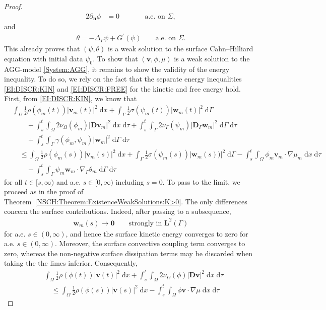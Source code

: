 \documentclass[11pt,reqno]{amsart}
\theoremstyle{remark}
\numberwithin{equation}{section}
\newcommand{\abs}[1]{|#1|}
\newcommand{\n}{\mathbf{n}}
\newcommand{\intO}{\int_\Omega}
\newcommand{\intG}{\int_\Gamma}
\newcommand{\dx}{\;\mathrm{d}x}
\newcommand{\dxtau}{\;\mathrm{d}x\;\mathrm{d}\tau}
\newcommand{\dGtau}{\;\mathrm{d}\Ga\;\mathrm{d}\tau}
\newcommand{\dG}{\;\mathrm d\Ga}
\newcommand{\deln}{\partial_\n}
\newcommand{\Grad}{\nabla}
\newcommand{\Gradg}{\nabla_\Ga}
\newcommand{\Lapg}{\Delta_\Ga}
\newcommand{\Om}{\Omega}
\newcommand{\Ga}{\Gamma}
\newcommand{\bv}{\mathbf v}
\newcommand{\bw}{\mathbf w}
\newcommand{\D}{\mathbf D}
\newcommand{\Dg}{\mathbf D_\Ga}
\begin{document}
\begin{proof}
\begin{alignat*}{2}
    \deln\phi &= 0 &&\qquad\text{a.e.~on~}\Sigma,
\end{alignat*}
and
\begin{align*}
    \theta = -\Lapg\psi + G^\prime(\psi) \qquad\text{a.e.~on~}\Sigma.
\end{align*} 
This already proves that $(\psi,\theta)$ is a weak solution to the surface Cahn--Hilliard equation with initial data $\psi_0$.
To show that $(\bv,\phi,\mu)$ is a weak solution to the AGG-model \eqref{System:AGG}, it remains to show the validity of the energy inequality. To do so, we rely on the fact that the separate energy inequalities \eqref{EI:DISCR:KIN} and \eqref{EI:DISCR:FREE} for the kinetic and free energy hold. First, from \eqref{EI:DISCR:KIN}, we know that
\begin{align*}%
    &\intO\frac12\rho(\phi_m(t))\abs{\bv_m(t)}^2\dx + \intG\frac12\sigma(\psi_m(t))\abs{\bw_m(t)}^2\dG \nonumber \\
    &\qquad + \int_s^t\intO 2\nu_\Om(\phi_m)\abs{\D\bv_m}^2\dxtau + \int_s^t\intG 2\nu_\Ga(\psi_m)\abs{\Dg\bw_m}^2\dGtau \nonumber \\
    &\qquad + \int_s^t\intG \gamma(\phi_m,\psi_m)\abs{\bw_m}^2\dGtau \nonumber \\
    &\quad\leq \intO\frac12\rho(\phi_m(s))\abs{\bv_m(s)}^2\dx + \intG\frac12\sigma(\psi_m(s))\abs{\bw_m(s))}^2\dG - \int_s^t\intO \phi_m\bv_m\cdot\Grad\mu_m\dxtau \nonumber \\
    &\qquad - \int_s^t\intG \psi_m\bw_m\cdot\Gradg\theta_m\dGtau
\end{align*}
for all $t\in[s,\infty)$ and a.e. $s\in[0,\infty)$ including $s = 0$. To pass to the limit, we proceed as in the proof of Theorem~\ref{NSCH:Theorem:ExistenceWeakSolutions:K>0}. The only differences concern the surface contributions. Indeed, after passing to a subsequence,
\begin{align*}
    \bw_m(s) \rightarrow \mathbf 0 \qquad\text{strongly in~}\mathbf{L}^2(\Ga)
\end{align*}
for a.e. $s\in(0,\infty)$, and hence the surface kinetic energy converges to zero for a.e. $s\in(0,\infty)$. Moreover, the surface convective coupling term converges to zero, whereas the non-negative surface dissipation terms may be discarded when taking the the limes inferior. Consequently,
\begin{align*}
    &\intO\frac12\rho(\phi(t))\abs{\bv(t)}^2\dx + \int_s^t\intO 2\nu_\Om(\phi)\abs{\D\bv}^2\dxtau \\
    &\quad\leq \intO\frac12\rho(\phi(s))\abs{\bv(s)}^2\dx - \int_s^t\intO \phi\bv\cdot\Grad\mu\dxtau 

\end{align*}
\end{proof}
\end{document}
